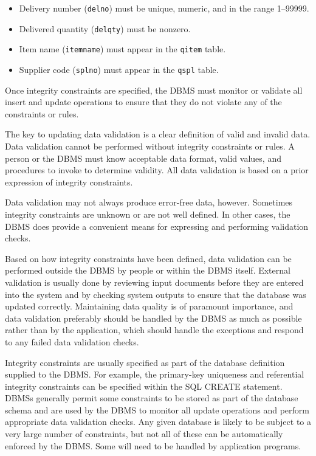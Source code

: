 \documentclass[
]{article}
\begin{document}
\begin{itemize}
\item
  Delivery number (\texttt{delno}) must be unique, numeric, and in the range
  1--99999.
\item
  Delivered quantity (\texttt{delqty}) must be nonzero.
\item
  Item name (\texttt{itemname}) must appear in the \texttt{qitem} table.
\item
  Supplier code (\texttt{splno}) must appear in the \texttt{qspl} table.
\end{itemize}

Once integrity constraints are specified, the DBMS must monitor or
validate all insert and update operations to ensure that they do not
violate any of the constraints or rules.

The key to updating data validation is a clear definition of valid and
invalid data. Data validation cannot be performed without integrity
constraints or rules. A person or the DBMS must know acceptable data
format, valid values, and procedures to invoke to determine validity.
All data validation is based on a prior expression of integrity
constraints.

Data validation may not always produce error-free data, however.
Sometimes integrity constraints are unknown or are not well defined. In
other cases, the DBMS does provide a convenient means for expressing and
performing validation checks.

Based on how integrity constraints have been defined, data validation
can be performed outside the DBMS by people or within the DBMS itself.
External validation is usually done by reviewing input documents before
they are entered into the system and by checking system outputs to
ensure that the database was updated correctly. Maintaining data quality
is of paramount importance, and data validation preferably should be
handled by the DBMS as much as possible rather than by the application,
which should handle the exceptions and respond to any failed data
validation checks.

Integrity constraints are usually specified as part of the database
definition supplied to the DBMS. For example, the primary-key uniqueness
and referential integrity constraints can be specified within the SQL
CREATE statement. DBMSs generally permit some constraints to be stored
as part of the database schema and are used by the DBMS to monitor all
update operations and perform appropriate data validation checks. Any
given database is likely to be subject to a very large number of
constraints, but not all of these can be automatically enforced by the
DBMS. Some will need to be handled by application programs.
\end{document}
